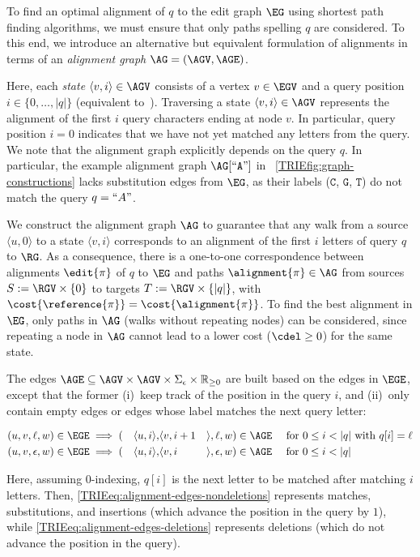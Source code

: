 
To find an optimal alignment of $q$ to the edit graph $\EG$ using shortest path
finding algorithms, we must ensure that only paths spelling $q$ are considered.
To this end, we introduce an alternative but equivalent formulation of
alignments in terms of an \emph{alignment graph} $\AG=(\AGV,\AGE)$.

Here, each \emph{state} $\langle v,i \rangle \in \AGV$ consists of a vertex $v \in
\EGV$ and a query position $i \in \{0,\dots,|q|\}$ (equivalent
to~\cite{rautiainen_aligning_2017}). Traversing a state $\langle v,i \rangle \in
\AGV$ represents the alignment of the first $i$ query characters ending at node $v$.
%
In particular, query position $i=0$ indicates that we have not yet matched any
letters from the query.
%
We note that the alignment graph explicitly depends on the query $q$. In
particular, the example alignment graph $\AG[``\texttt{A}"]$ in
~\cref{TRIEfig:graph-constructions} lacks substitution edges from $\EG$, as their
labels ($\texttt{C}$, $\texttt{G}$, $\texttt{T}$) do not match the query
$q=``A"$.

We construct the alignment graph $\AG$ to guarantee that any walk from a source
$\langle u,0 \rangle$ to a state $\langle v,i \rangle$ corresponds to an
alignment of the first $i$ letters of query $q$ to $\RG$. As a consequence,
there is a one-to-one correspondence between alignments $\edit{\pi}$ of $q$ to
$\EG$ and paths $\alignment{\pi} \in \AG$ from sources $S:=\RGV \times \{0\}$ to
targets $T:=\RGV \times \{|q|\}$, with
$\cost{\reference{\pi}}=\cost{\alignment{\pi}}$. To find the best alignment in
$\EG$, only paths in $\AG$ (walks without repeating nodes) can be considered,
since repeating a node in $\AG$ cannot lead to a lower cost ($\cdel \geq 0$) for
the same state.

\begin{samepage}
The edges $\AGE \subseteq \AGV \times \AGV \times \Sigma_\epsilon \times
\mathbb{R}_{\geq 0}$ are built based on the edges in $\EGE$, except that the
former (i)~keep track of the position in the query $i$, and (ii)~only contain
empty edges or edges
whose label matches the next query letter:

\vspace{-1.2em}
{%
\small
\begin{alignat}{10}
	(u,v,\ell,w) &\in \EGE \implies (&\langle u, i \rangle, &\langle v, i+1
		&&\rangle,\ell,w) \in \AGE \quad \text{ for } 0 \leq i < |q| \text{ with }
		q[i]=\ell \label{TRIEeq:alignment-edges-nondeletions} \\
	(u,v,\epsilon,w) &\in\EGE \implies (&\langle u, i \rangle, &\langle v, i
		&&\rangle,\epsilon,w) \in \AGE \quad \text{ for } 0 \leq i < |q| \label{TRIEeq:alignment-edges-deletions}
\end{alignat}
}%
\end{samepage}
%
Here, assuming $0$-indexing, $q[i]$ is the next letter to be matched after
matching $i$ letters. Then, \cref{TRIEeq:alignment-edges-nondeletions} represents
matches, substitutions, and insertions (which advance the position in the query
by $1$), while \cref{TRIEeq:alignment-edges-deletions} represents deletions (which do
not advance the position in the query).

